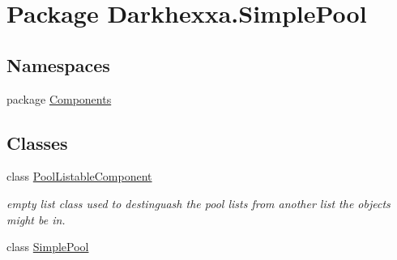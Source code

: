 \hypertarget{namespace_darkhexxa_1_1_simple_pool}{\section{Package Darkhexxa.\-Simple\-Pool}
\label{namespace_darkhexxa_1_1_simple_pool}
}
\subsection*{Namespaces}
\begin{DoxyCompactItemize}
\item 
package \hyperlink{namespace_darkhexxa_1_1_simple_pool_1_1_components}{Components}
\end{DoxyCompactItemize}
\subsection*{Classes}
\begin{DoxyCompactItemize}
\item 
class \hyperlink{class_darkhexxa_1_1_simple_pool_1_1_pool_listable_component}{Pool\-Listable\-Component}
\begin{DoxyCompactList}\small\item\em empty list class used to destinguash the pool lists from another list the objects might be in. \end{DoxyCompactList}\item 
class \hyperlink{class_darkhexxa_1_1_simple_pool_1_1_simple_pool}{Simple\-Pool}
\end{DoxyCompactItemize}
